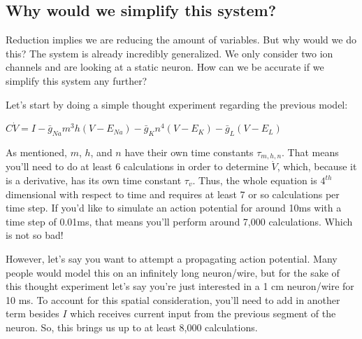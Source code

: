 \documentclass[12pt]{report}
\begin{document}
\subsection{Why would we simplify this system?} Reduction implies we are reducing the amount of variables. But why would we do this? The system is already incredibly generalized. We only consider two ion channels and are looking at a static neuron. How can we be accurate if we simplify this system any further?\newline

Let's start by doing a simple thought experiment regarding the previous model: 

\bigskip

\begin{center}

    $C\dot{V} = I - \bar{g}_{Na}m^3h(V - E_{Na}) - \bar{g}_{K}n^4(V - E_{K}) - \bar{g}_{L}(V - E_{L})$
    
\end{center}

\bigskip

As mentioned, $m$, $h$, and $n$ have their own time constants $\tau_{m,h,n}$. That means you'll need to do at least 6 calculations in order to determine $\dot{V}$, which, because it is a derivative, has its own time constant $\tau_v$. Thus, the whole equation is $4^{th}$ dimensional with respect to time and requires at least 7 or so calculations per time step. If you'd like to simulate an action potential for around 10ms with a time step of 0.01ms, that means you'll perform around 7,000 calculations. Which is not so bad!\newline 

However, let's say you want to attempt a propagating action potential. Many people would model this on an infinitely long neuron/wire, but for the sake of this thought experiment let's say you're just interested in a 1 cm neuron/wire for 10 ms. To account for this spatial consideration, you'll need to add in another term besides $I$ which receives current input from the previous segment of the neuron. So, this brings us up to at least 8,000 calculations.\newline
\end{document}
